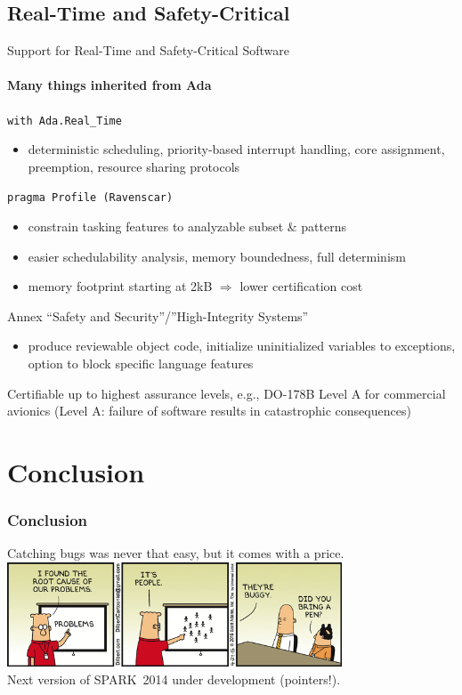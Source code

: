 \subsection{Real-Time and Safety-Critical}
\begin{frame}{Support for Real-Time and Safety-Critical Software}  
  \framesubtitle{Many things inherited from Ada}
  
  \texttt{with Ada.Real\_Time}
  \begin{itemize}
  \item deterministic scheduling, priority-based interrupt handling, core assignment, preemption, resource sharing protocols
  \end{itemize}
  \texttt{pragma Profile (Ravenscar)}
  \begin{itemize}
  \item constrain tasking features to analyzable subset \& patterns
  \item easier schedulability analysis, memory boundedness, full determinism
  \item memory footprint starting at 2kB $\Rightarrow$ lower certification cost
  \end{itemize}
  Annex ``Safety and Security''/''High-Integrity Systems''
  \begin{itemize}
  \item produce reviewable object code, initialize uninitialized variables to exceptions, option to block specific language features
  \end{itemize}
  Certifiable up to highest assurance levels, e.g., DO-178B Level A for commercial avionics (Level A: failure of software results in catastrophic consequences)
\end{frame}
\addtocounter{clock}{4}
\addtocounter{clock}{3}

\section{Conclusion}
\begin{frame}
  \frametitle{Conclusion}

Catching bugs was never that easy, but it comes with a price. \vspace{1em}\\

\includegraphics[height=3.1cm]{content/images/spark/people}\vspace{2em}\\
Next version of SPARK~2014 under development (pointers!).

\end{frame}

